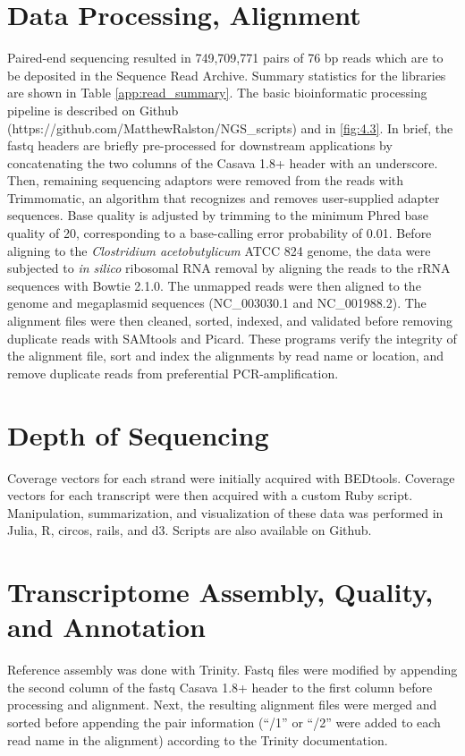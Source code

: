 \section{Data Processing, Alignment}\label{methods:read_process_align}
Paired-end sequencing resulted in 749,709,771 pairs of 76 bp reads which are to be deposited in the Sequence Read Archive. Summary statistics for the libraries are shown in Table \ref{app:read_summary}. The basic bioinformatic processing pipeline is described on Github (https://github.com/MatthewRalston/NGS_scripts) and in \ref{fig:4.3}. In brief, the fastq headers are briefly pre-processed for downstream applications by concatenating the two columns of the Casava 1.8+ header with an underscore. Then, remaining sequencing adaptors were removed from the reads with Trimmomatic\cite{47}, an algorithm that recognizes and removes user-supplied adapter sequences. Base quality is adjusted by trimming to the minimum Phred base quality of 20, corresponding to a base-calling error probability of 0.01. Before aligning to the \textit{Clostridium acetobutylicum} ATCC 824 genome, the data were subjected to \textit{in silico} ribosomal RNA removal by aligning the reads to the rRNA sequences with Bowtie 2.1.0\cite{17}. The unmapped reads were then aligned to the genome and megaplasmid sequences (NC_003030.1 and NC_001988.2). The alignment files were then cleaned, sorted, indexed, and validated before removing duplicate reads with SAMtools\cite{19} and Picard\cite{40}. These programs verify the integrity of the alignment file, sort and index the alignments by read name or location, and remove duplicate reads from preferential PCR-amplification.

\section{Depth of Sequencing}
Coverage vectors for each strand were initially acquired with BEDtools\cite{49}. Coverage vectors for each transcript were then acquired with a custom Ruby script. Manipulation, summarization, and visualization of these data was performed in Julia, R\cite{59}, circos, rails, and d3. Scripts are also available on Github. 

\section{Transcriptome Assembly, Quality, and Annotation}
Reference assembly was done with Trinity\cite{58}. Fastq files were modified by appending the second column of the fastq Casava 1.8+ header to the first column before processing and alignment. Next, the resulting alignment files were merged and sorted before appending the pair information (``/1'' or ``/2'' were added to each read name in the alignment) according to the Trinity documentation.

